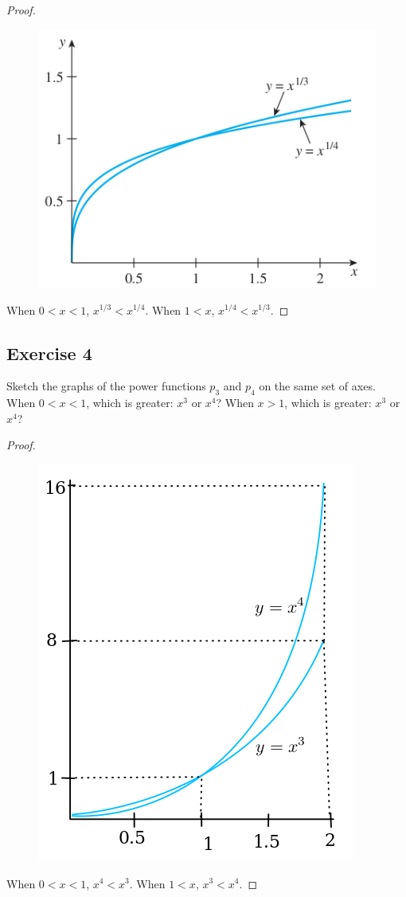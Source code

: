 \documentclass[14pt]{extarticle}
\begin{document}
\begin{proof}
\begin{figure}[ht!]
\centering
\includegraphics[scale=0.5]{../images/11.1.3.png}
\end{figure}
When \(0 < x < 1\), \(x^{1/3} < x^{1/4}\). When \(1 < x\), \(x^{1/4} < x^{1/3}\).
\end{proof}

\subsection{Exercise 4}
Sketch the graphs of the power functions \(p_3\) and \(p_4\) on the same set of axes. When \(0 < x < 1\), which is greater: 
\(x^3\) or \(x^4\)? When \(x > 1\), which is greater: \(x^3\) or \(x^4\)?

\begin{proof}
\begin{figure}[ht!]
\centering
\includegraphics[scale=0.4]{../images/11.1.4.png}
\end{figure}
When \(0 < x < 1\), \(x^4 < x^3\). When \(1 < x\), \(x^3 < x^4\).
\end{proof}
\end{document}
